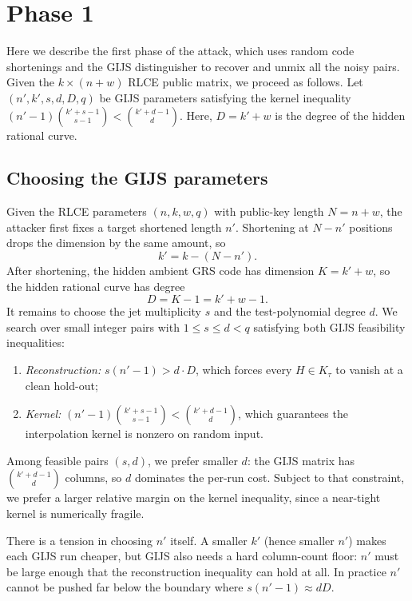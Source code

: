 



\section{Phase 1}\label{sec:phase1}
Here we describe the first phase of the attack, which uses random code shortenings and the GIJS distinguisher to 
recover and unmix all the noisy pairs. Given the $k \times (n+w)$ RLCE public matrix, we proceed as follows.
Let $(n', k', s, d, D, q)$ be GIJS parameters
satisfying the kernel inequality
$(n'-1)\binom{k'+s-1}{s-1} < \binom{k'+d-1}{d}$. Here, $D = k'+w$ is the degree
of the hidden rational curve.

\subsection{Choosing the GIJS parameters}\label{sec:param-choice}

Given the RLCE parameters $(n, k, w, q)$ with public-key length $N = n + w$,
the attacker first fixes a target shortened length $n'$. Shortening at
$N - n'$ positions drops the dimension by the same amount, so
\[
    k' = k - (N - n').
\]
After shortening, the hidden ambient GRS code has dimension $K = k' + w$, so the
hidden rational curve has degree
\[
    D = K - 1 = k' + w - 1.
\]
It remains to choose the jet multiplicity $s$ and the test-polynomial degree
$d$. We search over small integer pairs with $1 \le s \le d < q$ satisfying
both GIJS feasibility inequalities:
\begin{enumerate}
    \item \emph{Reconstruction:} $s(n'-1) > d \cdot D$, which forces every
          $H \in K_\tau$ to vanish at a clean hold-out;
    \item \emph{Kernel:} $(n'-1)\binom{k'+s-1}{s-1} < \binom{k'+d-1}{d}$,
          which guarantees the interpolation kernel is nonzero on random input.
\end{enumerate}
Among feasible pairs $(s,d)$, we prefer smaller $d$: the GIJS matrix has
$\binom{k'+d-1}{d}$ columns, so $d$ dominates the per-run cost. Subject to
that constraint, we prefer a larger relative margin on the kernel inequality,
since a
near-tight kernel is numerically fragile.

There is a tension in choosing $n'$ itself. A smaller $k'$ (hence smaller
$n'$) makes each GIJS run cheaper, but GIJS also needs a hard column-count
floor: $n'$ must be large enough that the reconstruction inequality can hold
at all. In practice $n'$ cannot be pushed far below the boundary where
$s(n'-1) \approx dD$.


